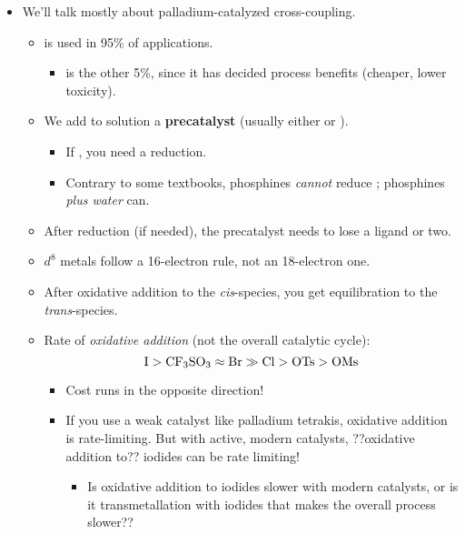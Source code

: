 \documentclass[../notes.tex]{subfiles}
\begin{document}
\begin{itemize}
    \item We'll talk mostly about palladium-catalyzed cross-coupling.
    \begin{itemize}
        \item {} is used in 95\% of applications.
        \begin{itemize}
            \item {} is the other 5\%, since it has decided process benefits (cheaper, lower toxicity).
        \end{itemize}
        \item We add to solution a \textbf{precatalyst} (usually either  or ).
        \begin{itemize}
            \item If , you need a reduction.
            \item Contrary to some textbooks, phosphines \emph{cannot} reduce ; phosphines \emph{plus water} can.
        \end{itemize}
        \item After reduction (if needed), the precatalyst needs to lose a ligand or two.
        \item $d^8$ metals follow a 16-electron rule, not an 18-electron one.
        \item After oxidative addition to the \emph{cis}-species, you get equilibration to the \emph{trans}-species.
        \item Rate of \emph{oxidative addition} (not the overall catalytic cycle):
        \begin{equation*}
            \ce{I} > \ce{CF3SO3} \approx \ce{Br} \gg \ce{Cl} > \ce{OTs} > \ce{OMs}
        \end{equation*}
        \begin{itemize}
            \item Cost runs in the opposite direction!
            \item If you use a weak catalyst like palladium tetrakis, oxidative addition is rate-limiting. But with active, modern catalysts, ??oxidative addition to?? iodides can be rate limiting!
            \begin{itemize}
                \item Is oxidative addition to iodides slower with modern catalysts, or is it transmetallation with iodides that makes the overall process slower??
            \end{itemize}
        \end{itemize}

\end{itemize}
\end{itemize}
\end{document}
